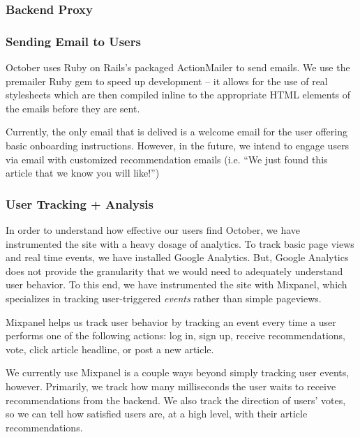 \documentclass[11pt,letterpaper]{article}
\begin{document}
\subsubsection{Backend Proxy}

\subsubsection{Sending Email to Users}
October uses Ruby on Rails's packaged ActionMailer to send emails.
We use the premailer Ruby gem to speed up development -- it allows for the use of real stylesheets which are then compiled inline to the appropriate HTML elements of the emails before they are sent.

Currently, the only email that is delived is a welcome email for the user offering basic onboarding instructions.
However, in the future, we intend to engage users via email with customized recommendation emails (i.e. ``We just found this article that we know you will like!'')

\subsubsection{User Tracking + Analysis}
\label{sec:tracking}
In order to understand how effective our users find October, we have instrumented the site with a heavy dosage of analytics.
To track basic page views and real time events, we have installed Google Analytics.
But, Google Analytics does not provide the granularity that we would need to adequately understand user behavior.
To this end, we have instrumented the site with Mixpanel\cite{mixpanel}, which specializes in tracking user-triggered \textit{events} rather than simple pageviews.

Mixpanel helps us track user behavior by tracking an event every time a user performs one of the following actions: log in, sign up, receive recommendations, vote, click article headline, or post a new article.

We currently use Mixpanel is a couple ways beyond simply tracking user events, however. Primarily, we track how many milliseconds the user waits to receive recommendations from the backend.
We also track the direction of users' votes, so we can tell how satisfied users are, at a high level, with their article recommendations.
\end{document}
